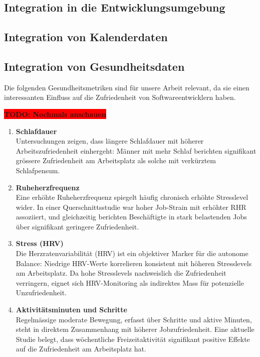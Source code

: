\documentclass[12pt,a4paper]{report}
\newcommand{\todo}[1]{\colorbox{red}{\textbf{TODO: #1}}\\}
\begin{document}
\subsection{Integration in die Entwicklungsumgebung}
\subsection{Integration von Kalenderdaten}
\subsection{Integration von Gesundheitsdaten}

Die folgenden Gesundheitsmetriken sind für unsere Arbeit relevant, da sie einen interessanten Einfluss
auf die Zufriedenheit von Softwareentwicklern haben.

\todo{Nochmals anschauen}
\begin{enumerate}
	\item \textbf{Schlafdauer}\\
	      Untersuchungen zeigen, dass längere Schlafdauer mit höherer Arbeitszufriedenheit einhergeht:
	      Männer mit mehr Schlaf berichten signifikant grössere Zufriedenheit am Arbeitsplatz als
	      solche mit verkürztem Schlafpensum.

	\item \textbf{Ruheherzfrequenz}\\
	      Eine erhöhte Ruheherzfrequenz spiegelt häufig chronisch erhöhte Stresslevel wider. In einer
	      Querschnittsstudie war hoher Job-Strain mit erhöhter RHR assoziiert, und gleichzeitig berichten
	      Beschäftigte in stark belastenden Jobs über signifikant geringere Zufriedenheit.

	\item \textbf{Stress (HRV)}\\
	      Die Herzratenvariabilität (HRV) ist ein objektiver Marker für die autonome Balance: Niedrige
	      HRV-Werte korrelieren konsistent mit höheren Stresslevels am Arbeitsplatz. Da hohe Stresslevels
	      nachweislich die Zufriedenheit verringern, eignet sich HRV-Monitoring als indirektes Mass für
	      potenzielle Unzufriedenheit.

	\item \textbf{Aktivitätsminuten und Schritte}\\
	      Regelmässige moderate Bewegung, erfasst über Schritte und aktive Minuten, steht in direktem
	      Zusammenhang mit höherer Jobzufriedenheit. Eine aktuelle Studie belegt, dass wöchentliche
	      Freizeitaktivität signifikant positive Effekte auf die Zufriedenheit am Arbeitsplatz hat.
\end{enumerate}
\end{document}
